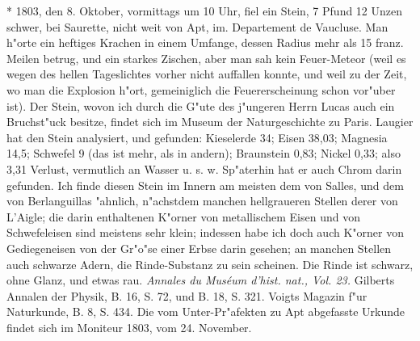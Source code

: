 \documentclass[a4paper, 11pt, oneside, polutonikogreek, german]{article}
\begin{document}
* 1803, den 8. Oktober, vormittags um 10 Uhr, fiel ein Stein, 7 Pfund 12 Unzen schwer, bei Saurette, nicht weit von Apt, im. Departement de Vaucluse. Man h"orte ein heftiges Krachen in einem Umfange, dessen Radius mehr als 15 franz. Meilen betrug, und ein starkes Zischen, aber man sah kein Feuer-Meteor (weil es wegen des hellen Tageslichtes vorher nicht auffallen konnte, und weil zu der Zeit, wo man die Explosion h"ort, gemeiniglich die Feuererscheinung schon vor"uber ist). Der Stein, wovon ich durch die G"ute des j"ungeren Herrn Lucas auch ein Bruchst"uck besitze, findet sich im Museum der Naturgeschichte zu Paris. Laugier hat den Stein analysiert, und gefunden: Kieselerde 34; Eisen 38,03; Magnesia 14,5; Schwefel 9 (das ist mehr, als in andern); Braunstein 0,83; Nickel 0,33; also 3,31 Verlust, vermutlich an Wasser u. s. w. Sp"aterhin hat er auch Chrom darin gefunden. Ich finde diesen Stein im Innern am meisten dem von Salles, und dem von Berlanguillas "ahnlich, n"achstdem manchen hellgraueren Stellen derer von L'Aigle; die darin enthaltenen K"orner von metallischem Eisen und von Schwefeleisen sind meistens sehr klein; indessen habe ich doch auch K"orner von Gediegeneisen von der Gr"o"se einer Erbse darin gesehen; an manchen Stellen auch schwarze Adern, die Rinde-Substanz zu sein scheinen. Die Rinde ist schwarz, ohne Glanz, und etwas rau. \emph{Annales du Muséum d'hist. nat., Vol. 23.} Gilberts Annalen der Physik, B. 16, S. 72, und B. 18, S. 321. Voigts Magazin f"ur Naturkunde, B. 8, S. 434. Die vom Unter-Pr"afekten zu Apt abgefasste Urkunde findet sich im Moniteur 1803, vom 24. November.
\end{document}
